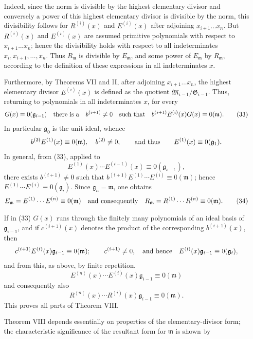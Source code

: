 \documentclass[11pt]{article}
\providecommand{\Gmod}{\mathfrak G}
\providecommand{\Mmod}{\mathfrak M}
\providecommand{\mideal}{\mathfrak m}
\providecommand{\gideal}{\mathfrak g}
\begin{document}
Indeed, since the norm is divisible by the highest elementary divisor and conversely a power of this highest elementary divisor is divisible by the norm, this divisibility follows for $R^{(i)}(x)$ and $E^{(i)}(x)$ after adjoining $x_{i+1}\ldots x_n$. But $R^{(i)}(x)$ and $E^{(i)}(x)$ are assumed primitive polynomials with respect to $x_{i+1}\ldots x_n$; hence the divisibility holds with respect to all indeterminates $x_i,x_{i+1},\ldots,x_n$. Thus $R_\mideal$ is divisible by $E_\mideal$, and some power of $E_\mideal$ by $R_\mideal$, according to the definition of these expressions in all indeterminates $x$.

Furthermore, by Theorems VII and II, after adjoining $x_{i+1}\ldots x_n$, the highest elementary divisor $E^{(i)}(x)$ is defined as the quotient $\Mmod_{i-1}/\Gmod_{i-1}$. Thus, returning to polynomials in all indeterminates $x$, for every
\begin{equation}
 G(x)\equiv0(\gideal_{i-1})
 \quad\hbox{there is a}\quad b^{(i+1)}\ne0
 \quad\hbox{such that}\quad b^{(i+1)}E^{(i)}(x)G(x)\equiv0(\mideal).
\tag{33}
\end{equation}
In particular $\gideal_0$ is the unit ideal, whence
\[
 b^{(2)}E^{(1)}(x)\equiv0(\mideal),\quad b^{(2)}\ne0,
 \qquad\hbox{and thus}\qquad E^{(1)}(x)\equiv0(\gideal_1).
\]
In general, from (33), applied to
\[
 E^{(1)}(x)\cdots E^{(i-1)}(x)\equiv0(\gideal_{i-1}),
\]
there exists $b^{(i+1)}\ne0$ such that $b^{(i+1)}E^{(1)}\cdots E^{(i)}\equiv0(\mideal)$; hence $E^{(1)}\cdots E^{(i)}\equiv0(\gideal_i)$. Since $\gideal_n=\mideal$, one obtains
\begin{equation}
 E_\mideal=E^{(1)}\cdots E^{(n)}\equiv0(\mideal)
 \quad\hbox{and consequently}\quad
 R_\mideal=R^{(1)}\cdots R^{(n)}\equiv0(\mideal).
\tag{34}
\end{equation}

If in (33) $G(x)$ runs through the finitely many polynomials of an ideal basis of $\gideal_{i-1}$, and if $c^{(i+1)}(x)$ denotes the product of the corresponding $b^{(i+1)}(x)$, then
\[
 c^{(i+1)}E^{(i)}(x)\gideal_{i-1}\equiv0(\mideal);
 \qquad c^{(i+1)}\ne0,
 \quad\hbox{and hence}\quad E^{(i)}(x)\gideal_{i-1}\equiv0(\gideal_i),
\]
and from this, as above, by finite repetition,
\[
 E^{(n)}(x)\cdots E^{(i)}(x)\gideal_{i-1}\equiv0(\mideal)
\]
and consequently also
\[
 R^{(n)}(x)\cdots R^{(i)}(x)\gideal_{i-1}\equiv0(\mideal).
\]
This proves all parts of Theorem VIII.

Theorem VIII depends essentially on properties of the elementary-divisor form; the characteristic significance of the resultant form for $\mideal$ is shown by
\end{document}
